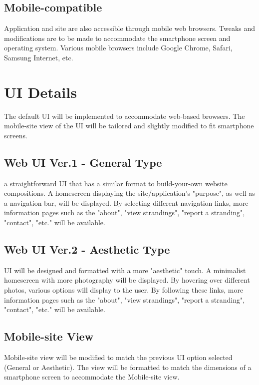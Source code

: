 \documentclass{article}
\begin{document}
\subsection{Mobile-compatible}
Application and site are also accessible through mobile web browsers. Tweaks and modifications are to be made to accommodate the smartphone screen and operating system. Various mobile browsers include Google Chrome, Safari, Samsung Internet, etc.
\newline \newline \newline \newline

\section{UI Details}
The default UI will be implemented to accommodate web-based browsers. The mobile-site view of the UI will be tailored and slightly modified to fit smartphone screens.
\subsection{Web UI Ver.1 - General Type}
a straightforward UI that has a similar format to build-your-own website compositions. A homescreen displaying the site/application's "purpose", as well as a navigation bar, will be displayed. By selecting different navigation links, more information pages such as the "about", "view strandings", "report a stranding", "contact", "etc." will be available.
\newline
\subsection{Web UI Ver.2 - Aesthetic Type}
UI will be designed and formatted with a more "aesthetic" touch. A minimalist homescreen with more photography will be displayed. By hovering over different photos, various options will display to the user. By following these links, more information pages such as the "about", "view strandings", "report a stranding", "contact", "etc." will be available.
\subsection{Mobile-site View}
Mobile-site view will be modified to match the previous UI option selected (General or Aesthetic). The view will be formatted to match the dimensions of a smartphone screen to accommodate the Mobile-site view.
\newline \newline \newline \newline
\end{document}
